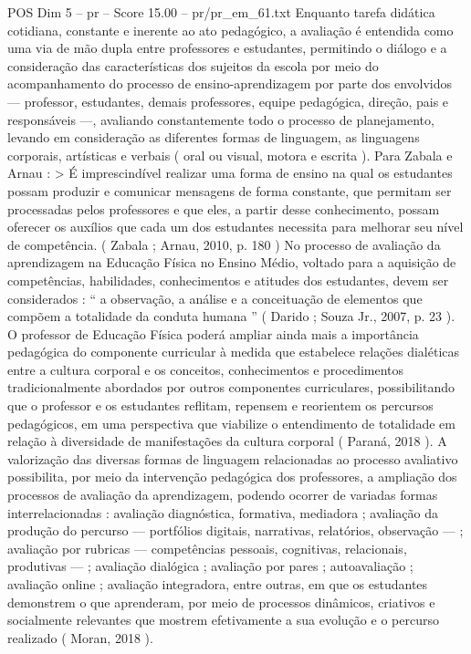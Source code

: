 \begin{textsample}{POS Dim 5 – pr – Score 15.00 – pr/pr\_em\_61.txt}
Enquanto tarefa didática cotidiana, constante e inerente ao ato pedagógico, a avaliação é entendida como uma via de mão dupla entre professores e estudantes, permitindo o diálogo e a consideração das características dos sujeitos da escola por meio do acompanhamento do processo de ensino-aprendizagem por parte dos envolvidos — professor, estudantes, demais professores, equipe pedagógica, direção, pais e responsáveis —, avaliando constantemente todo o processo de planejamento, levando em consideração as diferentes formas de linguagem, as linguagens corporais, artísticas e verbais ( oral ou visual, motora e escrita ).
Para Zabala e Arnau : > É imprescindível realizar uma forma de ensino na qual os estudantes possam produzir e comunicar mensagens de forma constante, que permitam ser processadas pelos professores e que eles, a partir desse conhecimento, possam oferecer os auxílios que cada um dos estudantes necessita para melhorar seu nível de competência. ( Zabala ; Arnau, 2010, p. 180 ) No processo de avaliação da aprendizagem na Educação Física no Ensino Médio, voltado para a aquisição de competências, habilidades, conhecimentos e atitudes dos estudantes, devem ser considerados : “ a observação, a análise e a conceituação de elementos que compõem a totalidade da conduta humana ” ( Darido ; Souza Jr., 2007, p. 23 ).
O professor de Educação Física poderá ampliar ainda mais a importância pedagógica do componente curricular à medida que estabelece relações dialéticas entre a cultura corporal e os conceitos, conhecimentos e procedimentos tradicionalmente abordados por outros componentes curriculares, possibilitando que o professor e os estudantes reflitam, repensem e reorientem os percursos pedagógicos, em uma perspectiva que viabilize o entendimento de totalidade em relação à diversidade de manifestações da cultura corporal ( Paraná, 2018 ).
A valorização das diversas formas de linguagem relacionadas ao processo avaliativo possibilita, por meio da intervenção pedagógica dos professores, a ampliação dos processos de avaliação da aprendizagem, podendo ocorrer de variadas formas interrelacionadas : avaliação diagnóstica, formativa, mediadora ; avaliação da produção do percurso — portfólios digitais, narrativas, relatórios, observação — ; avaliação por rubricas — competências pessoais, cognitivas, relacionais, produtivas — ; avaliação dialógica ; avaliação por pares ; autoavaliação ; avaliação online ; avaliação integradora, entre outras, em que os estudantes demonstrem o que aprenderam, por meio de processos dinâmicos, criativos e socialmente relevantes que mostrem efetivamente a sua evolução e o percurso realizado ( Moran, 2018 ).

\end{textsample}
